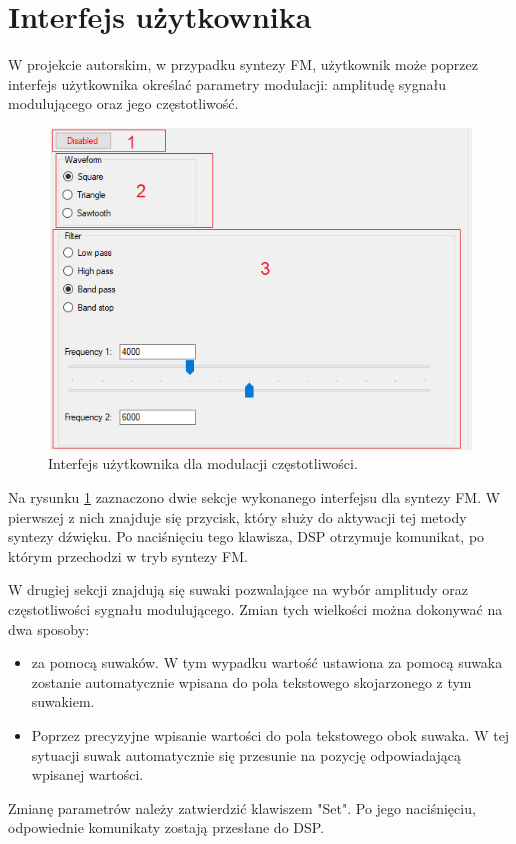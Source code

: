 \section{Interfejs użytkownika}
W projekcie autorskim, w przypadku syntezy FM, użytkownik może poprzez interfejs użytkownika określać parametry modulacji: amplitudę sygnału modulującego oraz jego częstotliwość.
\begin{figure}[H]
	\centering
	\includegraphics[width=12cm]{grafiki/sub_interface}
	\captionsetup{justification=centering}
	\caption{Interfejs użytkownika dla modulacji częstotliwości.}
	\label{rys:fm_interface}
\end{figure}
Na rysunku \ref{rys:fm_interface} zaznaczono dwie sekcje wykonanego interfejsu dla syntezy FM. W pierwszej z nich znajduje się przycisk, który służy do aktywacji tej metody syntezy dźwięku. Po naciśnięciu tego klawisza, DSP otrzymuje komunikat, po którym przechodzi w tryb syntezy FM.

W drugiej sekcji znajdują się suwaki pozwalające na wybór amplitudy oraz częstotliwości sygnału modulującego. Zmian tych wielkości można dokonywać na dwa sposoby:
\begin{itemize}
	\item za pomocą suwaków. W tym wypadku wartość ustawiona za pomocą suwaka zostanie automatycznie wpisana do pola tekstowego skojarzonego z tym suwakiem.
	\item Poprzez precyzyjne wpisanie wartości do pola tekstowego obok suwaka. W tej sytuacji suwak automatycznie się przesunie na pozycję odpowiadającą wpisanej wartości.
\end{itemize}
Zmianę parametrów należy zatwierdzić klawiszem "Set". Po jego naciśnięciu, odpowiednie komunikaty zostają przesłane do DSP.
